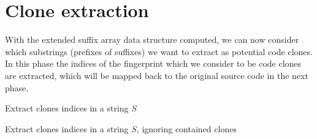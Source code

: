 \section{Clone extraction}

With the extended suffix array data structure computed, we can now consider which
substrings (prefixes of suffixes) we want to extract as potential code clones. In this
phase the indices of the fingerprint which we consider to be code clones are extracted,
which will be mapped back to the original source code in the next phase.

\begin{algorithm}[t]
  \SetAlgoLined\DontPrintSemicolon

  \vspace{0.5cm}
  \caption{Extract clones indices in a string $S$}
  \label{alg:simplecloneextraction}
\end{algorithm}

\begin{algorithm}[t]
  \SetAlgoLined\DontPrintSemicolon

  \vspace{0.5cm}
  \caption{Extract clones indices in a string $S$, ignoring contained clones}
  \label{alg:cloneextraction}
\end{algorithm}

